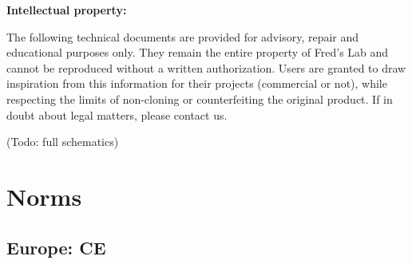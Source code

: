 \documentclass{scrartcl}
\begin{document}
\textbf{Intellectual property:}

The following technical documents are provided for advisory, repair and educational purposes only. They remain the entire property of Fred's Lab and cannot be reproduced without a written authorization. Users are granted to draw inspiration from this information for their projects (commercial or not), while respecting the limits of non-cloning or counterfeiting the original product. If in doubt about legal matters, please contact us.

\begin{center}
    (Todo: full schematics)
\end{center}
\pagebreak


\section{Norms}
\subsection{Europe: CE}
\end{document}
